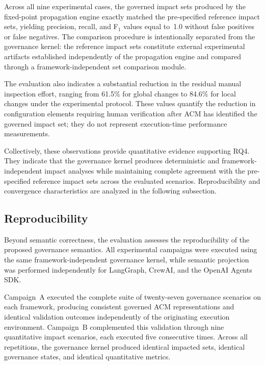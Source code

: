 \documentclass[10pt]{article}
\begin{document}
Across all nine experimental cases, the governed impact sets produced by the fixed-point propagation engine exactly matched the pre-specified reference impact sets, yielding precision, recall, and F$_1$ values equal to~1.0 without false positives or false negatives. The comparison procedure is intentionally separated from the governance kernel: the reference impact sets constitute external experimental artifacts established independently of the propagation engine and compared through a framework-independent set comparison module. 

The evaluation also indicates a substantial reduction in the residual manual inspection effort, ranging from 61.5\% for global changes to 84.6\% for local changes under the experimental protocol. These values quantify the reduction in configuration elements requiring human verification after ACM has identified the governed impact set; they do not represent execution-time performance measurements. 

Collectively, these observations provide quantitative evidence supporting RQ4. They indicate that the governance kernel produces deterministic and framework-independent impact analyses while maintaining complete agreement with the pre-specified reference impact sets across the evaluated scenarios. Reproducibility and convergence characteristics are analyzed in the following subsection.




\subsection{Reproducibility}
\label{subsec:reproducibility}

Beyond semantic correctness, the evaluation assesses the reproducibility of the proposed governance semantics. All experimental campaigns were executed using the same framework-independent governance kernel, while semantic projection was performed independently for LangGraph, CrewAI, and the OpenAI Agents SDK.

Campaign~A executed the complete suite of twenty-seven governance scenarios on each framework, producing consistent governed ACM representations and identical validation outcomes independently of the originating execution environment. Campaign~B complemented this validation through nine quantitative impact scenarios, each executed five consecutive times. Across all repetitions, the governance kernel produced identical impacted sets, identical governance states, and identical quantitative metrics.
\end{document}
